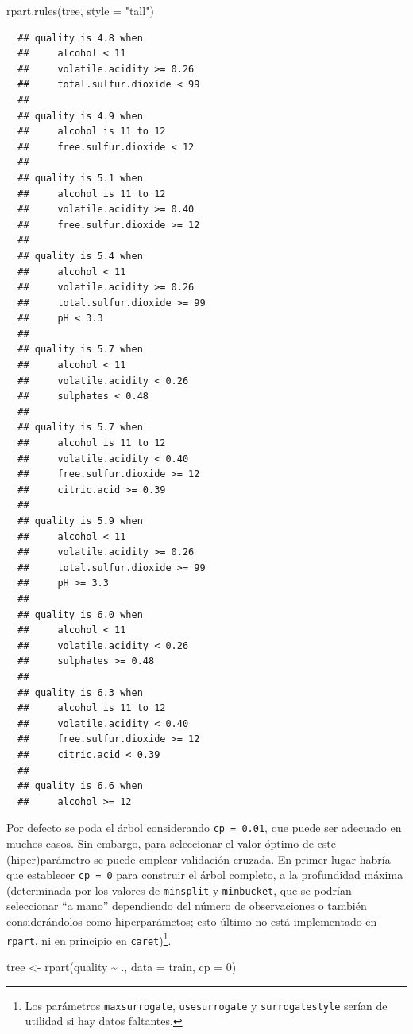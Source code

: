 \documentclass[
]{book}
\newenvironment{Shaded}{\begin{snugshade}}{\end{snugshade}}
\newcommand{\AttributeTok}[1]{\textcolor[rgb]{0.77,0.63,0.00}{#1}}
\newcommand{\DecValTok}[1]{\textcolor[rgb]{0.00,0.00,0.81}{#1}}
\newcommand{\FunctionTok}[1]{\textcolor[rgb]{0.00,0.00,0.00}{#1}}
\newcommand{\NormalTok}[1]{#1}
\newcommand{\OtherTok}[1]{\textcolor[rgb]{0.56,0.35,0.01}{#1}}
\newcommand{\SpecialCharTok}[1]{\textcolor[rgb]{0.00,0.00,0.00}{#1}}
\newcommand{\StringTok}[1]{\textcolor[rgb]{0.31,0.60,0.02}{#1}}
\theoremstyle{break}
\theoremstyle{nonumberplain}
\begin{document}
\begin{Shaded}
\begin{Highlighting}[]
\FunctionTok{rpart.rules}\NormalTok{(tree, }\AttributeTok{style =} \StringTok{"tall"}\NormalTok{)}
\end{Highlighting}
\end{Shaded}

\begin{verbatim}
  ## quality is 4.8 when
  ##     alcohol < 11
  ##     volatile.acidity >= 0.26
  ##     total.sulfur.dioxide < 99
  ## 
  ## quality is 4.9 when
  ##     alcohol is 11 to 12
  ##     free.sulfur.dioxide < 12
  ## 
  ## quality is 5.1 when
  ##     alcohol is 11 to 12
  ##     volatile.acidity >= 0.40
  ##     free.sulfur.dioxide >= 12
  ## 
  ## quality is 5.4 when
  ##     alcohol < 11
  ##     volatile.acidity >= 0.26
  ##     total.sulfur.dioxide >= 99
  ##     pH < 3.3
  ## 
  ## quality is 5.7 when
  ##     alcohol < 11
  ##     volatile.acidity < 0.26
  ##     sulphates < 0.48
  ## 
  ## quality is 5.7 when
  ##     alcohol is 11 to 12
  ##     volatile.acidity < 0.40
  ##     free.sulfur.dioxide >= 12
  ##     citric.acid >= 0.39
  ## 
  ## quality is 5.9 when
  ##     alcohol < 11
  ##     volatile.acidity >= 0.26
  ##     total.sulfur.dioxide >= 99
  ##     pH >= 3.3
  ## 
  ## quality is 6.0 when
  ##     alcohol < 11
  ##     volatile.acidity < 0.26
  ##     sulphates >= 0.48
  ## 
  ## quality is 6.3 when
  ##     alcohol is 11 to 12
  ##     volatile.acidity < 0.40
  ##     free.sulfur.dioxide >= 12
  ##     citric.acid < 0.39
  ## 
  ## quality is 6.6 when
  ##     alcohol >= 12
\end{verbatim}

Por defecto se poda el árbol considerando \texttt{cp\ =\ 0.01}, que puede ser adecuado en muchos casos.
Sin embargo, para seleccionar el valor óptimo de este (hiper)parámetro se puede emplear validación cruzada.
En primer lugar habría que establecer \texttt{cp\ =\ 0} para construir el árbol completo, a la profundidad máxima
(determinada por los valores de \texttt{minsplit} y \texttt{minbucket}, que se podrían seleccionar
``a mano'' dependiendo del número de observaciones o también considerándolos como hiperparámetos; esto último no está implementado en \texttt{rpart}, ni en principio en \texttt{caret})\footnote{Los parámetros \texttt{maxsurrogate}, \texttt{usesurrogate} y \texttt{surrogatestyle} serían de utilidad si hay datos faltantes.}.

\begin{Shaded}
\begin{Highlighting}[]
\NormalTok{tree }\OtherTok{\textless{}{-}} \FunctionTok{rpart}\NormalTok{(quality }\SpecialCharTok{\textasciitilde{}}\NormalTok{ ., }\AttributeTok{data =}\NormalTok{ train, }\AttributeTok{cp =} \DecValTok{0}\NormalTok{)}
\end{Highlighting}
\end{Shaded}
\end{document}

